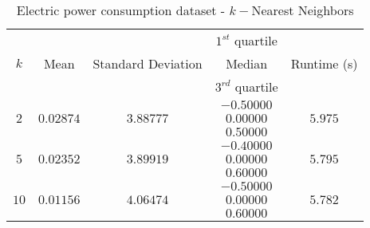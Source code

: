 \begin{table}[p]
\begin{center} 
\begin{tabular}{|c|c|c|c|c|}
			\hline \multirow{3}{*}{$k$} &&& $1^{st}$ quartile
			&\\&Mean&Standard Deviation&Median& Runtime (s)\\&&& $3^{rd}$ quartile &\\
			\hline \multirow{3}{*}{$2$}&&&$-0.50000$&\\
			& $0.02874$ & $3.88777$  & $0.00000$ & $5.975$\\
			&&&$0.50000$& \\
			\hline \multirow{3}{*}{$5$}&&&$-0.40000$ &\\
			& $0.02352$ & $3.89919$  & $0.00000$ & $5.795$\\
			&&&	$0.60000$& \\
			\hline \multirow{3}{*}{$10$}&&&	$-0.50000$ &\\
			& $0.01156$ & $4.06474$  & $0.00000$ & $5.782$\\
			&&&	$0.60000$& \\
			\hline

		\end{tabular}
	\end{center}
\caption{Electric power consumption dataset - $k-$Nearest Neighbors\label{ypmsd:table:ds3knnresults}}

\end{table}




